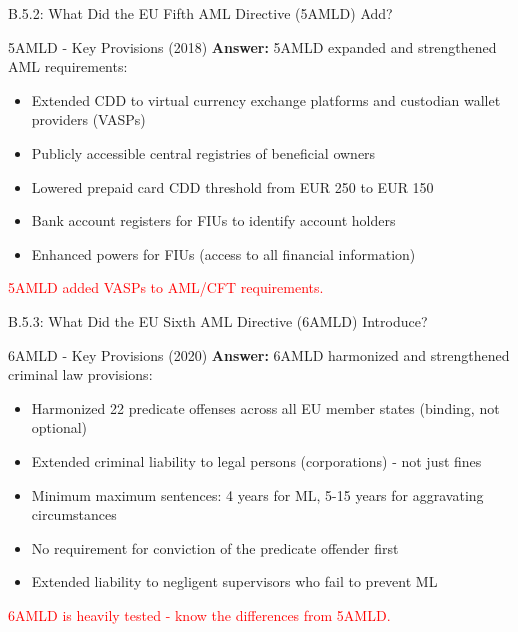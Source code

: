 \documentclass{beamer}
\begin{document}
	\begin{frame}{B.5.2: What Did the EU Fifth AML Directive (5AMLD) Add?}
		\begin{block}{5AMLD - Key Provisions (2018)}
			\textbf{Answer:} 5AMLD expanded and strengthened AML requirements:
			\vspace{0.2cm}
			\begin{itemize}
				\item Extended CDD to virtual currency exchange platforms and custodian wallet providers (VASPs)
				\item Publicly accessible central registries of beneficial owners
				\item Lowered prepaid card CDD threshold from EUR 250 to EUR 150
				\item Bank account registers for FIUs to identify account holders
				\item Enhanced powers for FIUs (access to all financial information)
			\end{itemize}
			\textcolor{red}{5AMLD added VASPs to AML/CFT requirements.}
		\end{block}
	\end{frame}
	
	\begin{frame}{B.5.3: What Did the EU Sixth AML Directive (6AMLD) Introduce?}
		\begin{block}{6AMLD - Key Provisions (2020)}
			\textbf{Answer:} 6AMLD harmonized and strengthened criminal law provisions:
			\vspace{0.2cm}
			\begin{itemize}
				\item Harmonized 22 predicate offenses across all EU member states (binding, not optional)
				\item Extended criminal liability to legal persons (corporations) - not just fines
				\item Minimum maximum sentences: 4 years for ML, 5-15 years for aggravating circumstances
				\item No requirement for conviction of the predicate offender first
				\item Extended liability to negligent supervisors who fail to prevent ML
			\end{itemize}
			\textcolor{red}{6AMLD is heavily tested - know the differences from 5AMLD.}
		\end{block}
	\end{frame}
	
	
\end{document}

